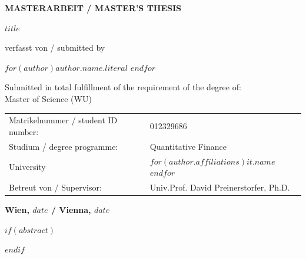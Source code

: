 \begin{center}
    \textbf{\huge MASTERARBEIT / MASTER’S THESIS} \\
    \vspace{1.5cm}

    \LARGE $title$ \\
    \vspace{2.5cm}
    
    \normalsize verfasst von / submitted by \\
    \vspace{0.5cm}
    
    \textit{\Large $for(author)$$author.name.literal$ $endfor$ \\}
    \vspace{2cm}
    
    Submitted in total fulfillment of the requirement of the degree of: \\
    \Large Master of Science (WU)
        \\
\vspace{1cm}
\normalsize

    \begin{tabular}{ll}
        Matrikelnummer / student ID number: & 012329686 \\
        Studium / degree programme: & Quantitative Finance \\
        University & $for(author.affiliations)$$it.name$ $endfor$ \\
        Betreut von / Supervisor: & Univ.Prof. David Preinerstorfer, Ph.D. \\
    \end{tabular}
    \vspace{2cm}
    
    \textbf{Wien, $date$ / Vienna, $date$}
\end{center}

\restoregeometry


$if(abstract)$
\begin{abstract}
$abstract$
\end{abstract}
$endif$